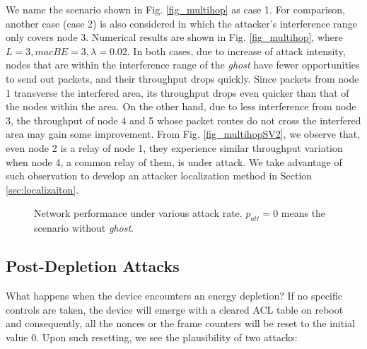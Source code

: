 \documentclass[10pt,journal,cspaper,compsoc]{IEEEtran}
\begin{document}
We name the scenario shown in Fig. \ref{fig_multihop} as case 1. For comparison, another case (case 2) is also considered in which the attacker's interference range only covers node 3. Numerical results are shown in Fig. \ref{fig_multihop}, where $L=3, macBE=3,\lambda=0.02$. In both cases, due to increase of attack intensity, nodes that are within the interference range of the {\em ghost} have fewer opportunities to send out packets, and their throughput drops quickly. Since packets from node 1 transverse the interfered area, its throughput drops even quicker than that of the nodes within the area. On the other hand, due to less interference from node 3, the throughput of node 4 and 5 whose packet routes do not cross the interfered area may gain some improvement. From Fig. \ref{fig_multihopSV2}, we observe that, even node 2 is a relay of node 1, they experience similar throughput variation when node 4, a common relay of them, is under attack. We take advantage of such observation to develop an attacker localization method in Section \ref{sec:localizaiton}.
\begin{figure}[htbp]
\centering
\caption{Network performance under various attack rate. $p_{att}=0$ means the scenario without {\em ghost}.}	
	\label{Fig_multihop}
    \vspace{-3mm}
\end{figure}

\subsection{Post-Depletion Attacks}
What happens when the device encounters an energy depletion? If no specific controls are taken, the device will emerge with a cleared ACL table on reboot and consequently, all the nonces or the frame counters will be reset to the initial value 0. Upon such resetting, we see the plausibility of two attacks:
\end{document}
